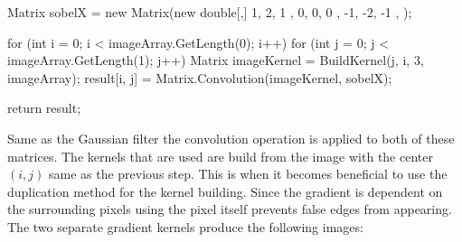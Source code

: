 \begin{FlushLeft}
\begin{cscode}
{    Matrix sobelX = new Matrix(new double[,] {
        { 1, 2, 1 },
        { 0, 0, 0 },
        { -1, -2, -1 },
    });

    for (int i = 0; i < imageArray.GetLength(0); i++)
    {
        for (int j = 0; j < imageArray.GetLength(1); j++)
        {
            Matrix imageKernel = BuildKernel(j, i, 3, imageArray);
            result[i, j] = Matrix.Convolution(imageKernel, sobelX);
        }
    }

    return result;
}
        \end{cscode}
        
        Same as the Gaussian filter the convolution operation is applied to both of these matrices. The kernels that are used are build from the image with the center $(i,j)$ same as the previous step. This is when it becomes beneficial to use the duplication method for the kernel building. Since the gradient is dependent on the surrounding pixels using the pixel itself prevents false edges from appearing. The two separate gradient kernels produce the following images:
        
        \begin{figure}[H]
            \centering
            \label{fig:proto_gradX}
            \qquad
            \label{fig:proto_gradY}
        \end{figure} \bk
        

\end{FlushLeft}
